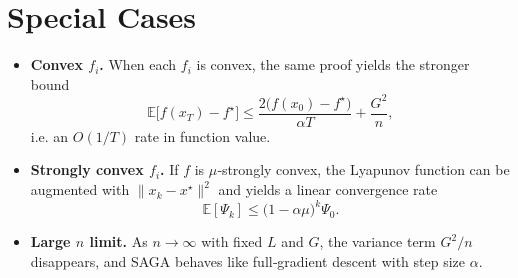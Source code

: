 \documentclass{article}
\newcommand{\EE}{\mathbb{E}}
\begin{document}
\section*{Special Cases}
\begin{itemize}
    \item \textbf{Convex $f_i$.} When each $f_i$ is convex, the same proof yields the stronger bound
    \[
    \EE\bigl[f(x_T)-f^{\star}\bigr]\le\frac{2\bigl(f(x_0)-f^{\star}\bigr)}{\alpha T}+\frac{G^{2}}{n},
    \]
    i.e. an $O(1/T)$ rate in function value.
    \item \textbf{Strongly convex $f_i$.} If $f$ is $\mu$‑strongly convex, the Lyapunov function can be augmented with $\|x_k-x^{\star}\|^{2}$ and yields a linear convergence rate
    \[
    \EE[\Psi_k]\le\bigl(1-\alpha\mu\bigr)^{k}\Psi_0.
    \]
    \item \textbf{Large $n$ limit.} As $n\to\infty$ with fixed $L$ and $G$, the variance term $G^{2}/n$ disappears, and SAGA behaves like full‑gradient descent with step size $\alpha$.
\end{itemize}
\end{document}
